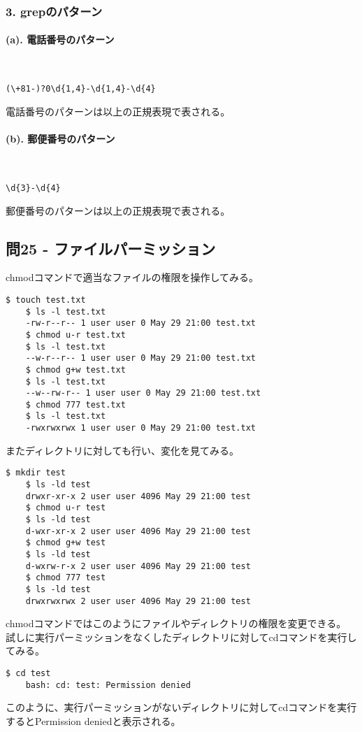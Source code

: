 \documentclass[a4paper,11pt]{jsarticle}
\begin{document}
\subsubsection*{3. grepのパターン}
\paragraph*{(a). 電話番号のパターン}\quad\\
\begin{lstlisting}[caption=問24-3(a)の解答]
    (\+81-)?0\d{1,4}-\d{1,4}-\d{4}
\end{lstlisting}
電話番号のパターンは以上の正規表現で表される。

\paragraph*{(b). 郵便番号のパターン}\quad\\
\begin{lstlisting}[caption=問24-3(b)の解答]
    \d{3}-\d{4}
\end{lstlisting}
郵便番号のパターンは以上の正規表現で表される。

\subsection*{問25 - ファイルパーミッション}
chmodコマンドで適当なファイルの権限を操作してみる。
\begin{lstlisting}[caption=問25の解答]
    $ touch test.txt
    $ ls -l test.txt
    -rw-r--r-- 1 user user 0 May 29 21:00 test.txt
    $ chmod u-r test.txt
    $ ls -l test.txt
    --w-r--r-- 1 user user 0 May 29 21:00 test.txt
    $ chmod g+w test.txt
    $ ls -l test.txt
    --w--rw-r-- 1 user user 0 May 29 21:00 test.txt
    $ chmod 777 test.txt
    $ ls -l test.txt
    -rwxrwxrwx 1 user user 0 May 29 21:00 test.txt
\end{lstlisting}
またディレクトリに対しても行い、変化を見てみる。
\begin{lstlisting}[caption=問25の解答]
    $ mkdir test
    $ ls -ld test
    drwxr-xr-x 2 user user 4096 May 29 21:00 test
    $ chmod u-r test
    $ ls -ld test
    d-wxr-xr-x 2 user user 4096 May 29 21:00 test
    $ chmod g+w test
    $ ls -ld test
    d-wxrw-r-x 2 user user 4096 May 29 21:00 test
    $ chmod 777 test
    $ ls -ld test
    drwxrwxrwx 2 user user 4096 May 29 21:00 test
\end{lstlisting}
chmodコマンドではこのようにファイルやディレクトリの権限を変更できる。
試しに実行パーミッションをなくしたディレクトリに対してcdコマンドを実行してみる。
\begin{lstlisting}[caption=問25の解答]
    $ cd test
    bash: cd: test: Permission denied
\end{lstlisting}
このように、実行パーミッションがないディレクトリに対してcdコマンドを実行するとPermission deniedと表示される。
\end{document}
